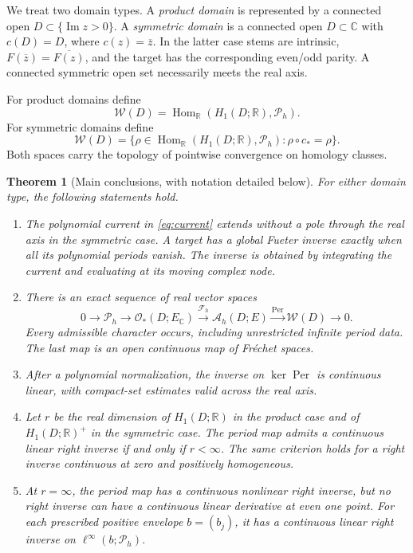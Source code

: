 \documentclass[11pt,a4paper]{article}
\numberwithin{equation}{section}
\newtheorem{theorem}{Theorem}[section]
\theoremstyle{definition}
\theoremstyle{remark}
\newcommand{\R}{\mathbb R}
\newcommand{\C}{\mathbb C}
\newcommand{\Hol}{\mathcal O}
\newcommand{\A}{\mathcal A_h}
\newcommand{\Fu}{\mathcal F_h}
\newcommand{\Pspace}{\mathscr P_h}
\newcommand{\Per}{\operatorname{Per}}
\newcommand{\calW}{\mathscr W}
\newcommand{\barz}{\overline z}
\begin{document}
We treat two domain types. A \emph{product domain} is represented by a
connected open $D\subset\{\operatorname{Im}z>0\}$. A \emph{symmetric domain}
is a connected open $D\subset\C$ with $c(D)=D$, where $c(z)=\barz$.
In the latter case stems are intrinsic,
$F(\barz)=\overline{F(z)}$, and the target has the corresponding even/odd
parity. A connected symmetric open set necessarily meets the real axis.

For product domains define
\[
 \calW(D)=\operatorname{Hom}_\R(H_1(D;\R),\Pspace).
\]
For symmetric domains define
\begin{equation}\label{eq:intro-W}
 \calW(D)=\{\rho\in\operatorname{Hom}_\R(H_1(D;\R),\Pspace):
                    \rho\circ c_*=\rho\}.
\end{equation}
Both spaces carry the topology of pointwise convergence on homology classes.

\begin{theorem}[Main conclusions, with notation detailed below]
\label{thm:main}
For either domain type, the following statements hold.
\begin{enumerate}[label=\textup{(\roman*)},leftmargin=2em,itemsep=3pt]
\item The polynomial current in \eqref{eq:current} extends without a pole
through the real axis in the symmetric case. A target has a global Fueter
inverse exactly when all its polynomial periods vanish. The inverse is
obtained by integrating the current and evaluating at its moving complex node.
\item There is an exact sequence of real vector spaces
\begin{equation}\label{eq:intro-exact}
 0\longrightarrow\Pspace\longrightarrow\Hol_*(D;E_\C)
 \xrightarrow{\Fu}\A(D;E)
 \xrightarrow{\Per}\calW(D)\longrightarrow0.
\end{equation}
Every admissible character occurs, including unrestricted infinite period data.
The last map is an open continuous map of Fr\'echet spaces.
\item After a polynomial normalization, the inverse on $\ker\Per$ is
continuous linear, with compact-set estimates valid across the real axis.
\item Let $r$ be the real dimension of $H_1(D;\R)$ in the product case and
of $H_1(D;\R)^+$ in the symmetric case. The period map admits a continuous
linear right inverse if and only if $r<\infty$. The same criterion holds for
a right inverse continuous at zero and positively homogeneous.
\item At $r=\infty$, the period map has a continuous nonlinear right inverse,
but no right inverse can have a continuous linear derivative at even one point.
For each prescribed positive envelope $b=(b_j)$, it has a continuous linear
right inverse on $\ell^\infty(b;\Pspace)$.
\end{enumerate}
\end{theorem}
\end{document}
